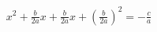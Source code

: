 \documentclass[preview]{standalone}
\begin{document}
\begin{align*}
{x}^{2} + \frac{b}{2 a} x + \frac{b}{2 a} x + {\left( \frac{b}{2 a} \right)}^{2} = - \frac{c}{a}
\end{align*}
\end{document}
